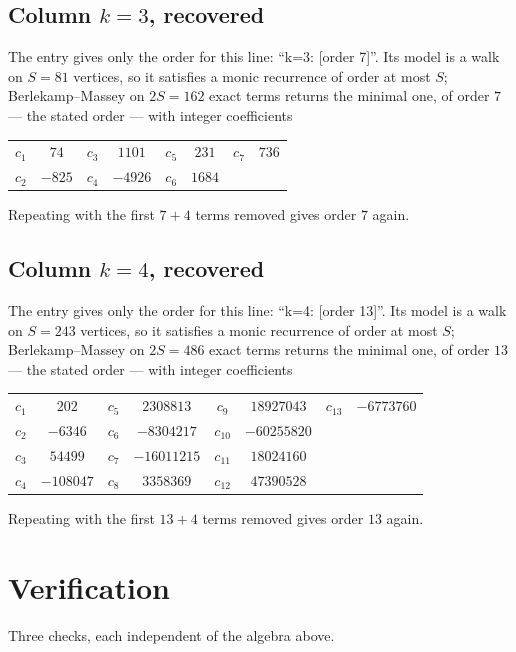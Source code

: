 \documentclass[11pt,a4paper]{article}
\theoremstyle{plain}
\theoremstyle{definition}
\begin{document}
\subsection*{Column $k=3$, recovered}
The entry gives only the order for this line: ``k=3: [order 7]''. Its model is a walk on
$S=81$ vertices, so it satisfies a monic recurrence of order at most $S$;
Berlekamp--Massey on $2S=162$ exact terms returns the minimal one, of order
$7$ --- the stated order --- with integer coefficients
\begin{center}\small\begin{tabular}{cccccccc}
$c_{1}$ & $74$ & $c_{3}$ & $1101$ & $c_{5}$ & $231$ & $c_{7}$ & $736$ \\
$c_{2}$ & $-825$ & $c_{4}$ & $-4926$ & $c_{6}$ & $1684$ &  &  \\
\end{tabular}\end{center}
Repeating with the first $7+4$ terms removed gives order $7$ again.

\subsection*{Column $k=4$, recovered}
The entry gives only the order for this line: ``k=4: [order 13]''. Its model is a walk on
$S=243$ vertices, so it satisfies a monic recurrence of order at most $S$;
Berlekamp--Massey on $2S=486$ exact terms returns the minimal one, of order
$13$ --- the stated order --- with integer coefficients
\begin{center}\small\begin{tabular}{cccccccc}
$c_{1}$ & $202$ & $c_{5}$ & $2308813$ & $c_{9}$ & $18927043$ & $c_{13}$ & $-6773760$ \\
$c_{2}$ & $-6346$ & $c_{6}$ & $-8304217$ & $c_{10}$ & $-60255820$ &  &  \\
$c_{3}$ & $54499$ & $c_{7}$ & $-16011215$ & $c_{11}$ & $18024160$ &  &  \\
$c_{4}$ & $-108047$ & $c_{8}$ & $3358369$ & $c_{12}$ & $47390528$ &  &  \\
\end{tabular}\end{center}
Repeating with the first $13+4$ terms removed gives order $13$ again.

\section{Verification}

Three checks, each independent of the algebra above.
\end{document}
